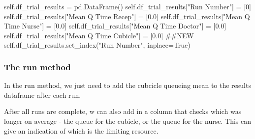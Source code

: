\documentclass[
  letterpaper,
  DIV=11,
  numbers=noendperiod]{scrreprt}
\newenvironment{Shaded}{}{}
\newcommand{\CommentTok}[1]{\textcolor[rgb]{0.42,0.45,0.49}{#1}}
\newcommand{\DecValTok}[1]{\textcolor[rgb]{0.00,0.36,0.77}{#1}}
\newcommand{\FloatTok}[1]{\textcolor[rgb]{0.00,0.36,0.77}{#1}}
\newcommand{\NormalTok}[1]{\textcolor[rgb]{0.14,0.16,0.18}{#1}}
\newcommand{\OperatorTok}[1]{\textcolor[rgb]{0.14,0.16,0.18}{#1}}
\newcommand{\StringTok}[1]{\textcolor[rgb]{0.01,0.18,0.38}{#1}}
\newcommand{\VariableTok}[1]{\textcolor[rgb]{0.89,0.38,0.04}{#1}}
\begin{document}
\begin{Shaded}
\begin{Highlighting}[]
\VariableTok{self}\NormalTok{.df\_trial\_results }\OperatorTok{=}\NormalTok{ pd.DataFrame()}
\VariableTok{self}\NormalTok{.df\_trial\_results[}\StringTok{"Run Number"}\NormalTok{] }\OperatorTok{=}\NormalTok{ [}\DecValTok{0}\NormalTok{]}
\VariableTok{self}\NormalTok{.df\_trial\_results[}\StringTok{"Mean Q Time Recep"}\NormalTok{] }\OperatorTok{=}\NormalTok{ [}\FloatTok{0.0}\NormalTok{]}
\VariableTok{self}\NormalTok{.df\_trial\_results[}\StringTok{"Mean Q Time Nurse"}\NormalTok{] }\OperatorTok{=}\NormalTok{ [}\FloatTok{0.0}\NormalTok{]}
\VariableTok{self}\NormalTok{.df\_trial\_results[}\StringTok{"Mean Q Time Doctor"}\NormalTok{] }\OperatorTok{=}\NormalTok{ [}\FloatTok{0.0}\NormalTok{]}
\VariableTok{self}\NormalTok{.df\_trial\_results[}\StringTok{"Mean Q Time Cubicle"}\NormalTok{] }\OperatorTok{=}\NormalTok{ [}\FloatTok{0.0}\NormalTok{] }\CommentTok{\#\#NEW}
\VariableTok{self}\NormalTok{.df\_trial\_results.set\_index(}\StringTok{"Run Number"}\NormalTok{, inplace}\OperatorTok{=}\VariableTok{True}\NormalTok{)}
\end{Highlighting}
\end{Shaded}

\subsubsection{The run method}\label{the-run-method-7}

In the run method, we just need to add the cubcicle queueing mean to the
results dataframe after each run.

After all runs are complete, w can also add in a column that checks
which was longer on average - the queue for the cubicle, or the queue
for the nurse. This can give an indication of which is the limiting
resource.
\end{document}
